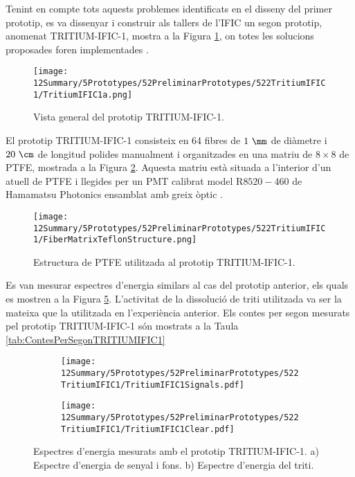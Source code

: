 Tenint en compte tots aquests problemes identificats en el disseny del primer prototip, es va dissenyar i construir als tallers de l'IFIC un segon prototip, anomenat TRITIUM-IFIC-1, mostra a la Figura \ref{fig:TritumIFIC1s}, on totes les solucions proposades foren implementades .

\begin{figure}[h]
\centering
\texttt{[image: 12Summary/5Prototypes/52PreliminarPrototypes/522TritiumIFIC1/TritiumIFIC1a.png]}
\caption{Vista general del prototip TRITIUM-IFIC-1.\label{fig:TritumIFIC1s}}
\end{figure}

El prototip TRITIUM-IFIC-1 consisteix en 64 fibres de $1~\mm$ de diàmetre i $20~\cm$ de longitud polides manualment i organitzades en una matriu de $8\times 8$ de PTFE, mostrada a la Figura \ref{fig:EstructuraPTFEFibresTritiumIFIC1}. Aquesta matriu està situada a l'interior d'un atuell de PTFE i llegides per un PMT calibrat model R$8520-460$ de Hamamatsu Photonics \cite{DataSheetPMTs} ensamblat amb greix òptic \cite{OpticalGrease}.

\begin{figure}[h]
\centering
\texttt{[image: 12Summary/5Prototypes/52PreliminarPrototypes/522TritiumIFIC1/FiberMatrixTeflonStructure.png]}
\caption{Estructura de PTFE utilitzada al prototip TRITIUM-IFIC-1.\label{fig:EstructuraPTFEFibresTritiumIFIC1}}
\end{figure}

Es van mesurar espectres d'energia similars al cas del prototip anterior, els quals es mostren a la Figura \ref{fig:EspectresEnergeticsTRITIUMIFIC1}. L'activitat de la dissolució de triti utilitzada va ser la mateixa que la utilitzada en l'experiència anterior. Els contes per segon mesurats pel prototip TRITIUM-IFIC-1 són mostrats a la Taula \ref{tab:ContesPerSegonTRITIUMIFIC1}

\begin{figure}
\centering
    \begin{subfigure}[b]{1\textwidth}
    \centering
    \texttt{[image: 12Summary/5Prototypes/52PreliminarPrototypes/522TritiumIFIC1/TritiumIFIC1Signals.pdf]}  
    \caption{\label{subfig:EspectreEnergeticSenyalFonsTritiumIFIC1}}
    \end{subfigure}
    \hfill
    \begin{subfigure}[b]{1\textwidth}
    \centering
    \texttt{[image: 12Summary/5Prototypes/52PreliminarPrototypes/522TritiumIFIC1/TritiumIFIC1Clear.pdf]}  
    \caption{\label{subfig:EspectreEnergeticTritiTritiumIFIC1}}
    \end{subfigure}
 \caption{Espectres d'energia mesurats amb el prototip TRITIUM-IFIC-1. a) Espectre d'energia de senyal i fons. b) Espectre d'energia del triti.}
 \label{fig:EspectresEnergeticsTRITIUMIFIC1}
\end{figure}

